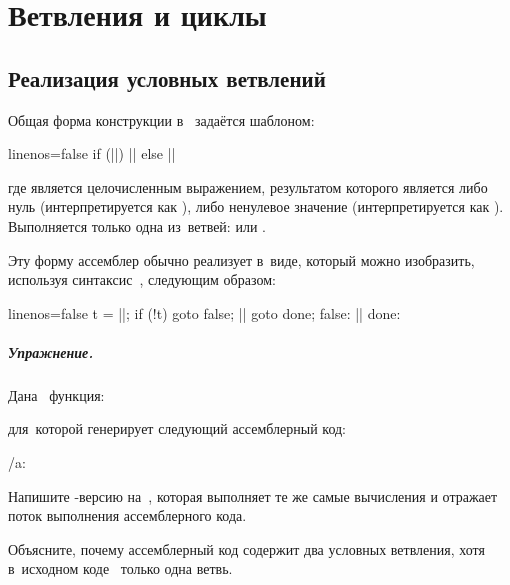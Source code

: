 
\chapter{Ветвления и циклы}

\section{Реализация условных ветвлений}
Общая форма конструкции  в~ задаётся шаблоном:

\begin{ccode*}{linenos=false}
if (||)
  ||
else
  ||
\end{ccode*}

\noindent где  является целочисленным выражением, результатом которого является либо нуль (интерпретируется как ), либо ненулевое значение (интерпретируется как ). Выполняется только одна из~ветвей:  или .

Эту форму ассемблер обычно реализует в~виде, который можно изобразить, используя синтаксис~, следующим образом:

\begin{ccode*}{linenos=false}
  t = ||;
  if (!t)
    goto false;
  ||
  goto done;
false:
  ||
done:
\end{ccode*}



\paragraph{Упражнение.}
Дана~ функция:


\noindent для~которой \GCC{} генерирует следующий ассемблерный код:

\precomment/a: %
\vspace{-1.6\baselineskip}

\begin{enumIssue}
  \item Напишите -версию на~, которая выполняет те же самые вычисления и отражает поток выполнения ассемблерного кода.

  \item Объясните, почему ассемблерный код содержит два условных ветвления, хотя в~исходном коде~ только одна ветвь.
\end{enumIssue}



